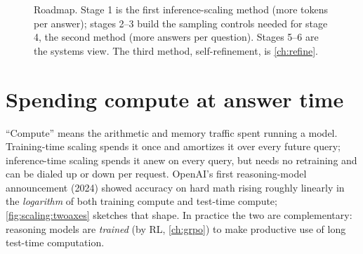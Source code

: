 \begin{figure}[t]
\centering
{}
\caption{Roadmap. Stage 1 is the first inference-scaling method (more tokens per answer); stages 2--3
build the sampling controls needed for stage 4, the second method (more answers per question).
Stages 5--6 are the systems view. The third method, self-refinement, is \cref{ch:refine}.}
\label{fig:scaling:roadmap}
\end{figure}

\section{Spending compute at answer time}\label{sec:scaling:intro}


``Compute'' means the arithmetic and memory traffic spent running a model. Training-time scaling
spends it once and amortizes it over every future query; inference-time scaling spends it anew on
every query, but needs no retraining and can be dialed up or down per request. OpenAI's first
reasoning-model announcement (2024) showed accuracy on hard math rising roughly linearly in the
\emph{logarithm} of both training compute and test-time compute; \cref{fig:scaling:twoaxes} sketches
that shape. In practice the two are complementary: reasoning models are \emph{trained} (by RL,
\cref{ch:grpo}) to make productive use of long test-time computation.

